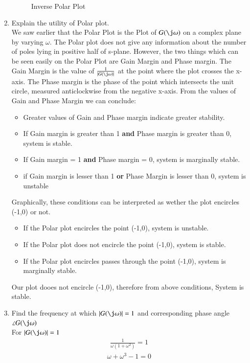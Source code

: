 \begin{enumerate}[label=\thesection.\arabic*.,ref=\thesection.\theenumi]
\begin{figure}
\caption{Inverse Polar Plot}
\label{fig:inverse_polar_plot}
\end{figure}
\item Explain the utility of Polar plot.
\\
\solution
We saw earlier that the Polar Plot is the Plot of $G(\j\omega)$ on a complex plane by varying $\omega$.
The Polar plot does not give any information about the number of poles lying in positive half of s-plane.
However, the two things which can be seen easily on the Polar Plot are Gain Margin and Phase margin.
The Gain Margin is the value of $\frac{1}{|G(\j\omega)|}$ at the point where the plot crosses the x-axis.
The Phase margin is the phase of the point which intersects the unit circle, measured anticlockwise from the negative x-axis.
From the values of Gain and Phase Margin we can conclude:
\begin{itemize}
\item Greater values of Gain and Phase margin indicate greater stability.
\item If Gain margin is greater than 1 \textbf{and} Phase margin is greater than 0, system is stable.
\item If Gain margin = 1 \textbf{and} Phase margin = 0, system is marginally stable. 
\item if Gain margin is lesser than 1 \textbf{or} Phase Margin is lesser than 0, system is unstable
\end{itemize}
Graphically, these conditions can be interpreted as wether the plot encircles (-1,0) or not.
\begin{itemize}
\item If the Polar plot encircles the point (-1,0), system is unstable.
\item If the Polar plot does not encircle the point (-1,0), system is stable.
\item If the Polar plot encircles passes through the point (-1,0), system is marginally stable.
\end{itemize}
Our plot dooes not encircle (-1,0), therefore from above conditions, System is stable. 
\item Find the frequency at which $|G(\j\omega)| = 1$ and corresponding phase angle $\angle G(\j\omega)$
\\
\solution 
For $|G(\j\omega)| = 1$
\begin{align}
\frac{1}{\omega(1+\omega^2)} = 1
\end{align}
\begin{align}
\omega + \omega^3 - 1 = 0
\end{align}

\end{enumerate}
